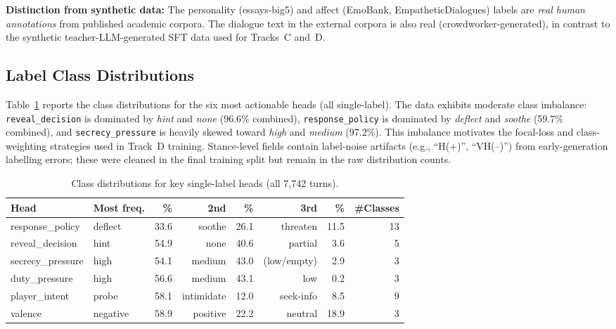 \documentclass[11pt]{article}
\begin{document}
\textbf{Distinction from synthetic data:} The personality (essays-big5) and affect (EmoBank, EmpatheticDialogues) labels are \textit{real human annotations} from published academic corpora.
The dialogue text in the external corpora is also real (crowdworker-generated), in contrast to the synthetic teacher-LLM-generated SFT data used for Tracks~C and~D.

\subsection{Label Class Distributions}

Table~\ref{tab:label_dist} reports the class distributions for the six most actionable heads (all single-label).
The data exhibits moderate class imbalance: \texttt{reveal\_decision} is dominated by \textit{hint} and \textit{none} (96.6\% combined), \texttt{response\_policy} is dominated by \textit{deflect} and \textit{soothe} (59.7\% combined), and \texttt{secrecy\_pressure} is heavily skewed toward \textit{high} and \textit{medium} (97.2\%).
This imbalance motivates the focal-loss and class-weighting strategies used in Track~D training.
Stance-level fields contain label-noise artifacts (e.g., ``H(+)'', ``VH(--)'') from early-generation labelling errors; these were cleaned in the final training split but remain in the raw distribution counts.

\begin{table}[h]
\centering
\caption{Class distributions for key single-label heads (all 7,742 turns).}
\label{tab:label_dist}
\small
\begin{tabular}{@{}llrrrrrr@{}}
\toprule
\textbf{Head} & \textbf{Most freq.} & \textbf{\%} & \textbf{2nd} & \textbf{\%} & \textbf{3rd} & \textbf{\%} & \textbf{\#Classes} \\
\midrule
response\_policy  & deflect   & 33.6 & soothe    & 26.1 & threaten   & 11.5 & 13 \\
reveal\_decision   & hint      & 54.9 & none      & 40.6 & partial    &  3.6 & 5  \\
secrecy\_pressure  & high      & 54.1 & medium    & 43.0 & (low/empty)&  2.9 & 3  \\
duty\_pressure     & high      & 56.6 & medium    & 43.1 & low        &  0.2 & 3  \\
player\_intent     & probe     & 58.1 & intimidate& 12.0 & seek-info  &  8.5 & 9  \\
valence           & negative  & 58.9 & positive  & 22.2 & neutral    & 18.9 & 3  \\
\bottomrule
\end{tabular}
\end{table}
\end{document}
